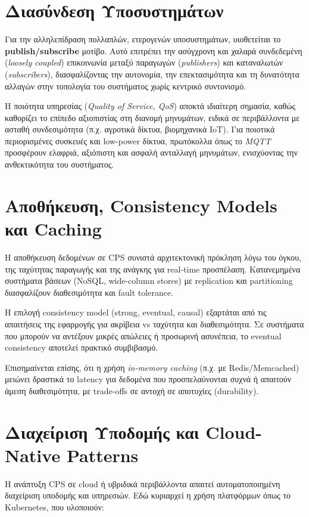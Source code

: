 \section{Διασύνδεση Υποσυστημάτων}

Για την αλληλεπίδραση πολλαπλών, ετερογενών υποσυστημάτων, υιοθετείται το \textbf{publish/subscribe} μοτίβο. Αυτό επιτρέπει την ασύγχρονη και χαλαρά συνδεδεμένη (\textit{loosely coupled}) επικοινωνία μεταξύ παραγωγών (\textit{publishers}) και καταναλωτών (\textit{subscribers}), διασφαλίζοντας την αυτονομία, την επεκτασιμότητα και τη δυνατότητα αλλαγών στην τοπολογία του συστήματος χωρίς κεντρικό συντονισμό.

Η ποιότητα υπηρεσίας (\textit{Quality of Service, QoS}) αποκτά ιδιαίτερη σημασία, καθώς καθορίζει το επίπεδο αξιοπιστίας στη διανομή μηνυμάτων, ειδικά σε περιβάλλοντα με ασταθή συνδεσιμότητα (π.χ. αγροτικά δίκτυα, βιομηχανικά IoT). Για ποιοτικά περιορισμένες συσκευές και low-power δίκτυα, πρωτόκολλα όπως το \textit{MQTT} προσφέρουν ελαφριά, αξιόπιστη και ασφαλή ανταλλαγή μηνυμάτων, ενισχύοντας την ανθεκτικότητα του συστήματος.

\section{Αποθήκευση, Consistency Models και Caching}

Η αποθήκευση δεδομένων σε CPS συνιστά αρχιτεκτονική πρόκληση λόγω του όγκου, της ταχύτητας παραγωγής και της ανάγκης για real-time προσπέλαση. Κατανεμημένα συστήματα βάσεων (NoSQL, wide-column stores) με replication και partitioning διασφαλίζουν διαθεσιμότητα και fault tolerance.

Η επιλογή consistency model (strong, eventual, causal) εξαρτάται από τις απαιτήσεις της εφαρμογής για ακρίβεια vs ταχύτητα και διαθεσιμότητα. Σε συστήματα που μπορούν να αντέξουν μικρές απώλειες ή προσωρινή ασυνέπεια, το eventual consistency αποτελεί πρακτικό συμβιβασμό.

Επισημαίνεται επίσης, ότι η χρήση \textit{in-memory caching} (π.χ. με Redis/Memcached) μειώνει δραστικά το latency για δεδομένα που προσπελαύνονται συχνά ή απαιτούν άμεση διαθεσιμότητα, με trade-offs σε αντοχή σε αποτυχίες (durability).

\section{Διαχείριση Υποδομής και Cloud-Native Patterns}

Η ανάπτυξη CPS σε cloud ή υβριδικά περιβάλλοντα απαιτεί αυτοματοποιημένη διαχείριση υποδομής και υπηρεσιών. Εδώ κυριαρχεί η χρήση πλατφόρμων όπως το Kubernetes, που υλοποιούν:

